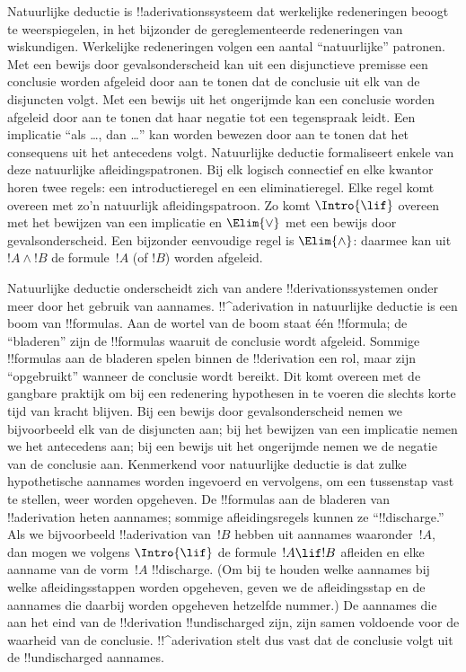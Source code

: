 \documentclass[../../../include/open-logic-section]{subfiles}
\begin{document}
      {}
      {}


Natuurlijke deductie is !!a{derivation}ssysteem dat werkelijke
redeneringen beoogt te weerspiegelen, in het bijzonder de
gereglementeerde redeneringen van wiskundigen. Werkelijke redeneringen
volgen een aantal ``natuurlijke'' patronen. Met een bewijs door
gevalsonderscheid kan uit een disjunctieve premisse een conclusie worden
afgeleid door aan te tonen dat de conclusie uit elk van de disjuncten
volgt. Met een bewijs uit het ongerijmde kan een conclusie worden
afgeleid door aan te tonen dat haar negatie tot een tegenspraak leidt.
Een implicatie ``als \dots, dan \dots'' kan worden bewezen door aan te
tonen dat het consequens uit het antecedens volgt. Natuurlijke deductie
formaliseert enkele van deze natuurlijke afleidingspatronen. Bij elk
logisch connectief en elke kwantor horen twee regels: een
introductieregel en een eliminatieregel. Elke regel komt overeen met
zo'n natuurlijk afleidingspatroon. Zo komt $\Intro{\lif}$ overeen met
het bewijzen van een implicatie en $\Elim{\lor}$ met een bewijs door
gevalsonderscheid. Een bijzonder eenvoudige regel is $\Elim{\land}$:
daarmee kan uit $!A \land !B$ de formule~$!A$ (of $!B$) worden afgeleid.

Natuurlijke deductie onderscheidt zich van andere
!!{derivation}ssystemen onder meer door het gebruik van aannames.
!!^a{derivation} in natuurlijke deductie is een boom van
!!{formula}s. Aan de wortel van de boom staat één !!{formula}; de
``bladeren'' zijn de !!{formula}s waaruit de conclusie wordt afgeleid.
Sommige !!{formula}s aan de bladeren spelen binnen de
!!{derivation} een rol, maar zijn ``opgebruikt'' wanneer de conclusie
wordt bereikt. Dit komt overeen met de gangbare praktijk om bij een
redenering hypothesen in te voeren die slechts korte tijd van kracht
blijven. Bij een bewijs door gevalsonderscheid nemen we bijvoorbeeld
elk van de disjuncten aan; bij het bewijzen van een implicatie nemen we
het antecedens aan; bij een bewijs uit het ongerijmde nemen we de
negatie van de conclusie aan. Kenmerkend voor natuurlijke deductie is
dat zulke hypothetische aannames worden ingevoerd en vervolgens, om
een tussenstap vast te stellen, weer worden opgeheven. De !!{formula}s
aan de bladeren van !!a{derivation} heten aannames; sommige
afleidingsregels kunnen ze ``!!{discharge}.'' Als we bijvoorbeeld
!!a{derivation} van~$!B$ hebben uit aannames waaronder~$!A$, dan mogen
we volgens $\Intro{\lif}$ de formule~$!A \lif !B$ afleiden en elke
aanname van de vorm~$!A$ !!{discharge}. (Om bij te houden welke
aannames bij welke afleidingsstappen worden opgeheven, geven we de
afleidingsstap en de aannames die daarbij worden opgeheven hetzelfde
nummer.) De aannames die aan het eind van de !!{derivation}
!!{undischarged} zijn, zijn samen voldoende voor de waarheid van de
conclusie. !!^a{derivation} stelt dus vast dat de conclusie volgt uit
de !!{undischarged} aannames.
\end{document}
